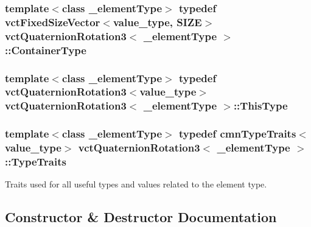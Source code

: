 \subsubsection[{Container\+Type}]{\setlength{\rightskip}{0pt plus 5cm}template$<$class \+\_\+element\+Type$>$ typedef {\bf vct\+Fixed\+Size\+Vector}$<$value\+\_\+type, {\bf S\+I\+Z\+E}$>$ {\bf vct\+Quaternion\+Rotation3}$<$ \+\_\+element\+Type $>$\+::{\bf Container\+Type}}\label{classvct_quaternion_rotation3_a73c9511393f9a59206e3ca57c3564454}
\hypertarget{classvct_quaternion_rotation3_a8150de55a15eb3adfc8f59a8815ddc70}{}
\subsubsection[{This\+Type}]{\setlength{\rightskip}{0pt plus 5cm}template$<$class \+\_\+element\+Type$>$ typedef {\bf vct\+Quaternion\+Rotation3}$<$value\+\_\+type$>$ {\bf vct\+Quaternion\+Rotation3}$<$ \+\_\+element\+Type $>$\+::{\bf This\+Type}}\label{classvct_quaternion_rotation3_a8150de55a15eb3adfc8f59a8815ddc70}
\hypertarget{classvct_quaternion_rotation3_aa51626a8a27b17262aaabb133ac868e9}{}
\subsubsection[{Type\+Traits}]{\setlength{\rightskip}{0pt plus 5cm}template$<$class \+\_\+element\+Type$>$ typedef {\bf cmn\+Type\+Traits}$<$value\+\_\+type$>$ {\bf vct\+Quaternion\+Rotation3}$<$ \+\_\+element\+Type $>$\+::{\bf Type\+Traits}}\label{classvct_quaternion_rotation3_aa51626a8a27b17262aaabb133ac868e9}
Traits used for all useful types and values related to the element type. 

\subsection{Constructor \& Destructor Documentation}
\hypertarget{classvct_quaternion_rotation3_aed78b9378e74d3ba8b71349472c57a67}{}
